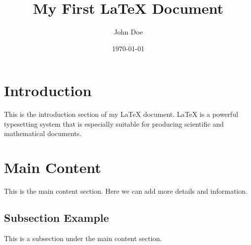 \documentclass{article}
\title{My First LaTeX Document}
\author{John Doe}
\date{\today}
\begin{document}
\maketitle
\section{Introduction}
This is the introduction section of my LaTeX document. LaTeX is a powerful typesetting system that is especially suitable for producing scientific and mathematical documents.

\section{Main Content}
This is the main content section. Here we can add more details and information.

\subsection{Subsection Example}
This is a subsection under the main content section.
\end{document}
